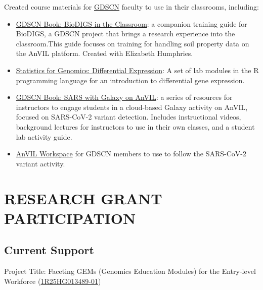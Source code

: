 \documentclass{cv}
\begin{document}
Created course materials for \href{https://www.gdscn.org/}{GDSCN} faculty to use in their classrooms, including: 

\begin{itemize}

\item \href{https://hutchdatascience.org/GDSCN_BioDIGS_Book/}{GDSCN Book: BioDIGS in the Classroom}: a companion training guide for BioDIGS, a GDSCN project that brings a research experience into the classroom.This guide focuses on training for handling soil property data on the AnVIL platform. Created with Elizabeth Humphries.

\item \href{https://jhudatascience.org/GDSCN_Book_Statistics_for_Genomics_Differential_Expression/}{Statistics for Genomics: Differential Expression}: A set of lab modules in the R programming language for an introduction to differential gene expression.

\item \href{https://jhudatascience.org/GDSCN_Book_SARS_Galaxy_on_AnVIL/}{GDSCN Book: SARS with Galaxy on AnVIL}: a series of resources for instructors to engage students in a cloud-based Galaxy activity on AnVIL, focused on SARS-CoV-2 variant detection. Includes instructional videos, background lectures for instructors to use in their own classes, and a student lab activity guide.

\item \href{https://anvil.terra.bio/#workspaces/gdscn-exercises/SARS-CoV-2-Genome}{AnVIL Workspace} for GDSCN members to use to follow the SARS-CoV-2 variant activity.

\end{itemize}


\section*{RESEARCH GRANT PARTICIPATION}

\subsection*{Current Support}

Project Title: Faceting GEMs (Genomics Education Modules) for the Entry-level Workforce (\href{https://reporter.nih.gov/search/pwbDP4bi2EGczoYgVimlTA/project-details/10854368}{1R25HG013489-01})
\end{document}
